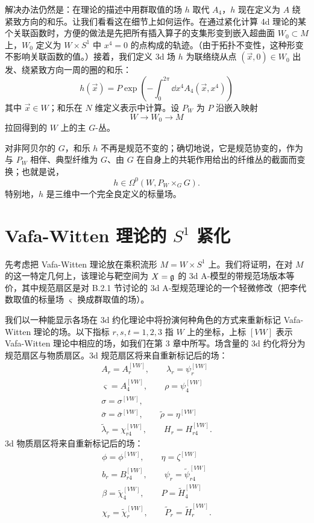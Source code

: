 解决办法仍然是：在理论的描述中用群取值的场 $h$ 取代 $A_4$，$h$ 现在定义为 $A$ 绕紧致方向的和乐。让我们看看这在细节上如何运作。在通过紧化计算 4d 理论的某个关联函数时，方便的做法是先把所有插入算子的支集形变到嵌入超曲面 $W_0\subset M$ 上，$W_0$ 定义为 $W\times S^1$ 中 $x^4=0$ 的点构成的轨迹。（由于拓扑不变性，这种形变不影响关联函数的值。）接着，我们定义 3d 场 $h$ 为联络绕从点 $(\vec x,0)\in W_0$ 出发、绕紧致方向一周的圈的和乐：
\[
    h(\vec x) = P\exp\left(-\int_0^{2\pi}\dd x^4 A_4(\vec x,x^4)\right)
\]
其中 $\vec x\in W$；和乐在 $N$ 维定义表示中计算。设 $P_W$ 为 $P$ 沿嵌入映射
\[
    W \longrightarrow W_0 \longrightarrow M
\]
拉回得到的 $W$ 上的主 $G$-丛。

对非阿贝尔的 $G$，和乐 $h$ 不再是规范不变的；确切地说，它是规范协变的，作为与 $P_W$ 相伴、典型纤维为 $G$、由 $G$ 在自身上的共轭作用给出的纤维丛的截面而变换；也就是说，
\[
    h \in \Omega^0(W, P_W \times_G G) .
\]
特别地，$h$ 是三维中一个完全良定义的标量场。

\section{Vafa-Witten 理论的 \texorpdfstring{$S^1$}{S1} 紧化}

先考虑把 Vafa-Witten 理论放在乘积流形 $M=W\times S^1$ 上。我们将证明，在对 $M$ 的这一特定几何上，该理论与靶空间为 $X=\mathfrak{g}$ 的 3d A-模型的带规范场版本等价，其中规范扇区是对 B.2.1 节讨论的 3d A-型规范理论的一个轻微修改（把李代数取值的标量场 $\varsigma$ 换成群取值的场）。


我们以一种能显示各场在 3d 约化理论中将扮演何种角色的方式来重新标记 Vafa-Witten 理论的场。以下指标 $r,s,t=1,2,3$ 指 $W$ 上的坐标，上标 $[VW]$ 表示 Vafa-Witten 理论中相应的场，如我们在第 3 章中所写。场含量的 3d 约化将分为规范扇区与物质扇区。3d 规范扇区将来自重新标记后的场：
\begin{gather*}
    A_r = A_r^{[VW]}, \qquad \lambda_r = \psi_r^{[VW]} \\
    \varsigma = A_4^{[VW]}, \qquad \rho = \psi_4^{[VW]} \\
    \sigma = \sigma^{[VW]}, \\
    \bar\sigma = \bar\sigma^{[VW]}, \qquad \tilde\rho = \eta^{[VW]} \\
    \tilde\lambda_r = \chi_{r4}^{[VW]}, \qquad H_r = H_{r4}^{[VW]} .
\end{gather*}
3d 物质扇区将来自重新标记后的场：
\begin{gather*}
    \phi = \phi^{[VW]}, \qquad \eta = \zeta^{[VW]} \\
    b_r = B_{r4}^{[VW]}, \qquad \psi_r = \tilde\psi_{r4}^{[VW]} \\
    \beta = \tilde\chi_4^{[VW]}, \qquad P = \tilde H_4^{[VW]} \\
    \chi_r = \tilde\chi_r^{[VW]}, \qquad \tilde P_r = \tilde H_r^{[VW]} .
\end{gather*}

